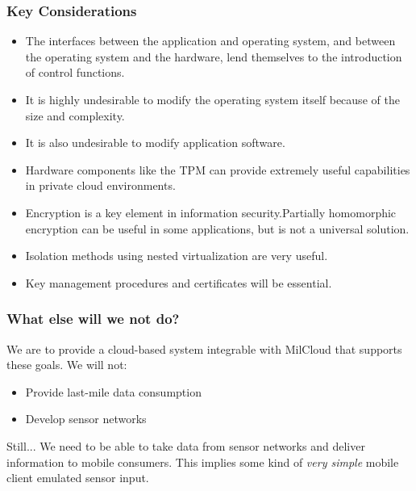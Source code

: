 \documentclass[t,handout]{beamer}
\begin{document}
\begin{frame}
\frametitle{Key Considerations}
\begin{itemize}
\item The interfaces between the application and operating system, and between the operating system and the hardware, lend themselves to the introduction of control functions.
\item It is highly undesirable to modify the operating system itself because of the size and complexity.
\item It is also undesirable to modify application software.
\item Hardware components like the TPM can provide extremely useful capabilities in private cloud environments.
\item Encryption is a key element in information security.Partially homomorphic encryption can be useful in some applications, but is not a universal solution.
\item Isolation methods using nested virtualization are very useful.
\item Key management procedures and certificates will be essential.
\end{itemize}
\end{frame}

\begin{frame}
\frametitle{What else will we not do?}
We are to provide a cloud-based system integrable with MilCloud that supports these goals.  We will not:
\begin{itemize}
\item Provide last-mile data consumption
\item Develop sensor networks
\end{itemize}
\begin{beamerboxesrounded}[shadow]{Still...}
{\small We need to be able to take data from sensor networks and deliver information to mobile consumers. This implies some kind of {\sl very simple} mobile client emulated sensor input.}
\end{beamerboxesrounded}
\end{frame}
\end{document}
